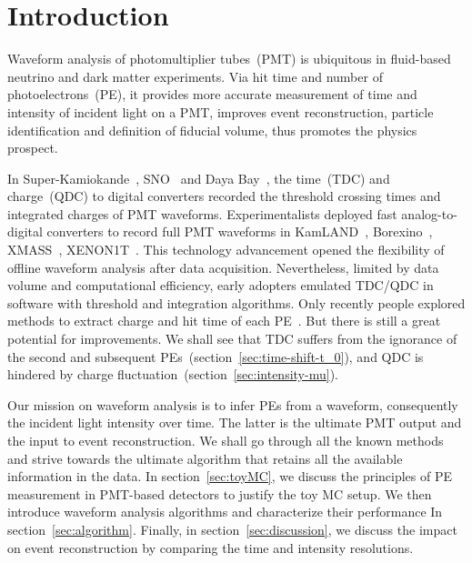 \section{Introduction}
\label{sec:introduction}

Waveform analysis of photomultiplier tubes~(PMT) is ubiquitous in fluid-based neutrino and dark matter experiments.  Via hit time and number of photoelectrons~(PE), it provides more accurate measurement of time and intensity of incident light on a PMT, improves event reconstruction, particle identification and definition of fiducial volume, thus promotes the physics prospect.

In Super-Kamiokande~\cite{noauthor_super-kamiokande_2003}, SNO~\cite{dunger_event_2019} and Daya Bay~\cite{daya_bay_collaboration_measurement_2017}, the time~(TDC) and charge~(QDC) to digital converters recorded the threshold crossing times and integrated charges of PMT waveforms.  Experimentalists deployed fast analog-to-digital converters to record full PMT waveforms in KamLAND~\cite{kamland_collaboration_production_2010}, Borexino~\cite{alimonti_borexino_2009}, XMASS~\cite{abe_xmass_2013}, XENON1T~\cite{xenon_collaboration_xenon1t_2019}.  This technology advancement opened the flexibility of offline waveform analysis after data acquisition.  Nevertheless, limited by data volume and computational efficiency, early adopters emulated TDC/QDC in software with threshold and integration algorithms.  Only recently people explored methods to extract charge and hit time of each PE~\cite{zhang_comparison_2019}.  But there is still a great potential for improvements.  We shall see that TDC suffers from the ignorance of the second and subsequent PEs~(section~\ref{sec:time-shift-t_0}), and QDC is hindered by charge fluctuation~(section~\ref{sec:intensity-mu}).

Our mission on waveform analysis is to infer PEs from a waveform, consequently the incident light intensity over time.  The latter is the ultimate PMT output and the input to event reconstruction.  We shall go through all the known methods and strive towards the ultimate algorithm that retains all the available information in the data.  In section~\ref{sec:toyMC}, we discuss the principles of PE measurement in PMT-based detectors to justify the toy MC setup.  We then introduce waveform analysis algorithms and characterize their performance In section~\ref{sec:algorithm}.  Finally, in section~\ref{sec:discussion}, we discuss the impact on event reconstruction by comparing the time and intensity resolutions.
